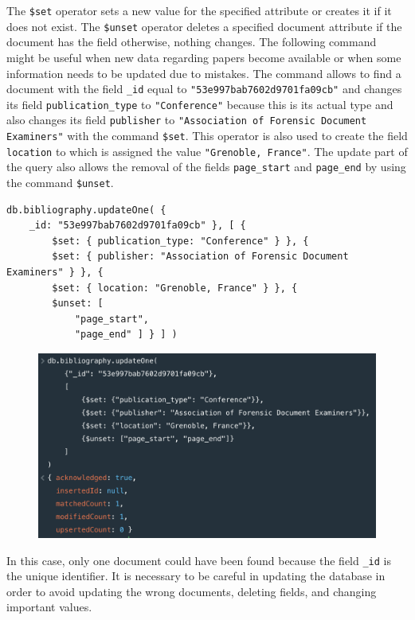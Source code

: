 \begin{enumerate}
    The \verb|$set| operator sets a new value for the specified attribute or creates it if it does not exist.
    The \verb|$unset| operator deletes a specified document attribute if the document has the field otherwise, nothing changes.
    The following command might be useful when new data regarding papers become available or when some information needs to be updated due to mistakes.
    The command allows to find a document with the field \verb|_id| equal to \verb|"53e997bab7602d9701fa09cb"| and changes its field \verb|publication_type| to \verb|"Conference"| because this is its actual type and also changes its field \verb|publisher| to \verb|"Association of Forensic Document Examiners"| with the command \verb|$set|.
    This operator is also used to create the field \verb|location| to which is assigned the value \verb|"Grenoble, France"|.
    The update part of the query also allows the removal of the fields \verb|page_start| and \verb|page_end| by using the command \verb|$unset|.
    \begin{lstlisting}[label={lst:command2mongodb}]
db.bibliography.updateOne( {
    _id: "53e997bab7602d9701fa09cb" }, [ {
        $set: { publication_type: "Conference" } }, {
        $set: { publisher: "Association of Forensic Document Examiners" } }, {
        $set: { location: "Grenoble, France" } }, {
        $unset: [
            "page_start",
            "page_end" ] } ] )
    \end{lstlisting}
    \begin{figure}[H]
        \begin{center}
            \includegraphics[width=0.9\linewidth]{ImagesMongoDB/command2mongo}
            \label{fig:command2mongodb}%
        \end{center}
    \end{figure}
    In this case, only one document could have been found because the field \verb|_id| is the unique identifier.
    It is necessary to be careful in updating the database in order to avoid updating the wrong documents, deleting fields, and changing important values.


\end{enumerate}
